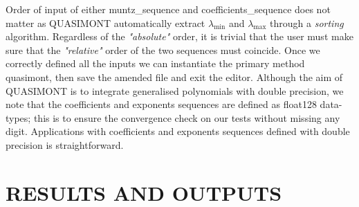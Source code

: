 \documentclass[a4paper, twosided]{book}
\begin{document}
\noindent
Order of input of either \colorbox{poliGrayBlue}{muntz\_sequence} and \colorbox{poliGrayBlue}{coefficients\_sequence} does not matter as QUASIMONT automatically extract $\lambda_{\text{min}}$ and $\lambda_{\text{max}}$ through a \textsl{sorting} algorithm. Regardless of the \textsl{"absolute"} order, it is trivial that the user must make sure that the \textsl{"relative"} order of the two sequences must coincide. Once we correctly defined all the inputs we can instantiate the primary method \colorbox{poliGrayBlue}{quasimont}, then save the amended file and exit the editor. Although the aim of QUASIMONT is to integrate generalised polynomials with double precision, we note that the coefficients and exponents sequences are defined as \colorbox{poliGrayBlue}{float128} data-types; this is to ensure the convergence check on our tests without missing any digit. Applications with coefficients and exponents sequences defined with double precision is straightforward.

\section[Results and outputs]{\changefont RESULTS AND OUTPUTS}\label{Sec3.2}
\end{document}

